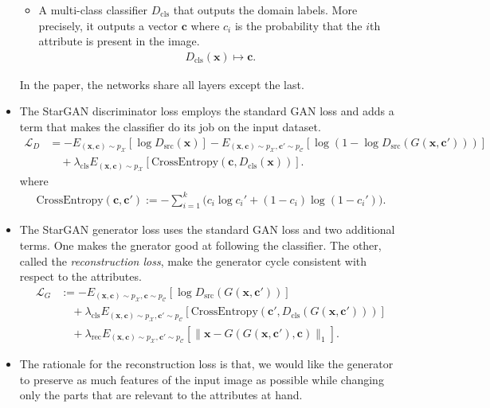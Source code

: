 \documentclass[10pt]{article}
\newcommand{\ve}[1]{\pmb{#1}}
\newcommand{\mc}[1]{\mathcal{#1}}
\newcommand{\mrm}[1]{\mathrm{#1}}
\begin{document}
\begin{itemize}
\begin{itemize}
      \item A multi-class classifier $D_{\mrm{cls}}$ that outputs the domain labels. More precisely, it outputs a vector $\ve{c}$ where $c_i$ is the probability that the $i$th attribute is present in the image.
      \begin{align*}
        D_{\mrm{cls}}(\ve{x}) \mapsto \ve{c}.
      \end{align*}
    \end{itemize}
    In the paper, the networks share all layers except the last.

    \item The StarGAN discriminator loss employs the standard GAN loss and adds a term that makes the classifier do its job on the input dataset.
    \begin{align*}
      \mc{L}_D 
      &= 
      -E_{(\ve{x},\ve{c}) \sim p_{\mc{X}}} [\log D_{\mrm{src}}(\ve{x})]    
      - E_{(\ve{x},\ve{c}) \sim p_{\mc{X}}, \ve{c}' \sim p_{\mc{C}}} [\log (1 - \log D_{\mrm{src}}(G(\ve{x}, \ve{c}')))] \\
      & \quad
      + \lambda_{\mrm{cls}} E_{(\ve{x},\ve{c}) \sim p_{\mc{X}}}[\mathrm{CrossEntropy}(\ve{c}, D_{\mrm{cls}}(\ve{x}))].
    \end{align*}
    where
    \begin{align*}
      \mathrm{CrossEntropy}(\ve{c}, \ve{c}')
      := -
      \sum_{i=1}^k \big( c_i \log c_i' + (1-c_i) \log (1-c_i')\big).
    \end{align*}

    \item The StarGAN generator loss uses the standard GAN loss and two additional terms. One makes the gnerator good at following the classifier. The other, called the \emph{reconstruction loss}, make the generator cycle consistent with respect to the attributes.
    \begin{align*}
      \mc{L}_G 
      &:=
      - E_{(\ve{x},\ve{c}) \sim p_{\mc{X}}, \ve{c} \sim p_{\mc{C}}} [\log D_{\mrm{src}}(G(\ve{x}, \ve{c}'))]
      \\
      & \quad
      + \lambda_{\mrm{cls}} E_{ (\ve{x},\ve{c}) \sim p_{\mc{X}}, \ve{c}' \sim p_{\mc{C}}} [\mrm{CrossEntropy}(\ve{c}', D_{\mrm{cls}}(G(\ve{x}, \ve{c}')))]
      \\
      & \quad
      + \lambda_{\mrm{rec}} E_{ (\ve{x},\ve{c}) \sim p_{\mc{X}}, \ve{c}' \sim p_{\mc{C}}} [ \| \ve{x} - G(G(\ve{x}, \ve{c}'), \ve{c}) \|_1 ].
    \end{align*}  

    \item The rationale for the reconstruction loss is that, we would like the generator to preserve as much features of the input image as possible while changing only the parts that are relevant to the attributes at hand.    
  \end{itemize}
\end{document}
